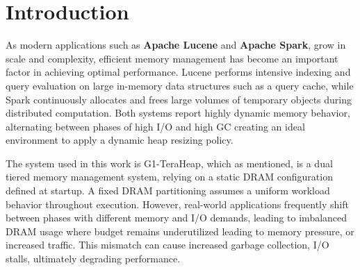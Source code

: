 \section{Introduction}



As modern applications such as \textbf{Apache Lucene}
\cite{klinaftakis2025thesis} and \textbf{Apache Spark}, grow in scale and
complexity, efficient memory management has become an important factor in
achieving optimal performance. Lucene performs intensive indexing and query
evaluation on large in-memory data structures such as a query cache, while
Spark continuously allocates and frees large volumes of temporary objects
during distributed computation. Both systems report highly dynamic memory
behavior, alternating between phases of high I/O and high GC creating an ideal
environment to apply a dynamic heap resizing policy.

The system used in this work is G1-TeraHeap, which as mentioned, is a dual
tiered memory management system, relying on a static DRAM configuration defined
at startup. A fixed DRAM partitioning assumes a uniform workload behavior
throughout execution. However, real-world applications frequently shift between
phases with different memory and I/O demands, leading to imbalanced DRAM usage
where budget remains underutilized leading to memory pressure, or increased
traffic. This mismatch can cause increased garbage  collection, I/O stalls,
ultimately degrading performance.

